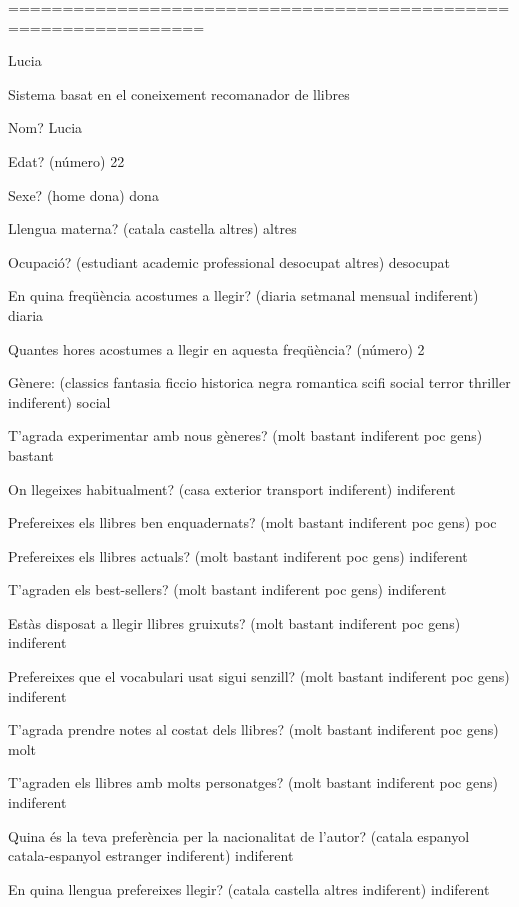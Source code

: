 ================================================================


Lucia

Sistema basat en el coneixement recomanador de llibres

Nom? Lucia

Edat?  (número) 22

Sexe? (home dona) dona

Llengua materna? (catala castella altres) altres

Ocupació? (estudiant academic professional desocupat altres) desocupat

En quina freqüència acostumes a llegir? (diaria setmanal mensual indiferent) diaria

Quantes hores acostumes a llegir en aquesta freqüència? (número) 2

Gènere:  (classics fantasia ficcio historica negra romantica scifi social terror thriller indiferent) social

T'agrada experimentar amb nous gèneres? (molt bastant indiferent poc gens) bastant

On llegeixes habitualment? (casa exterior transport indiferent) indiferent

Prefereixes els llibres ben enquadernats? (molt bastant indiferent poc gens) poc

Prefereixes els llibres actuals? (molt bastant indiferent poc gens) indiferent

T'agraden els best-sellers? (molt bastant indiferent poc gens) indiferent

Estàs disposat a llegir llibres gruixuts? (molt bastant indiferent poc gens) indiferent

Prefereixes que el vocabulari usat sigui senzill? (molt bastant indiferent poc gens) indiferent

T'agrada prendre notes al costat dels llibres? (molt bastant indiferent poc gens) molt

T'agraden els llibres amb molts personatges? (molt bastant indiferent poc gens) indiferent

Quina és la teva preferència per la nacionalitat de l'autor? (catala espanyol catala-espanyol estranger indiferent) indiferent

En quina llengua prefereixes llegir? (catala castella altres indiferent) indiferent

